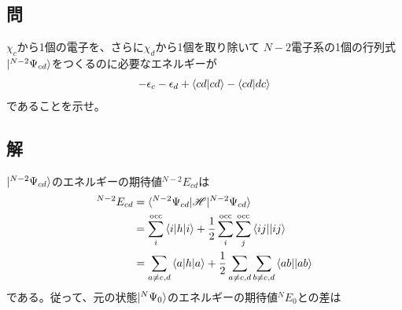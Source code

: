 \subsection{問}
$\chi_c$から1個の電子を、さらに$\chi_d$から1個を取り除いて
$N-2$電子系の1個の行列式$\ket{^{N-2}\Psi_{cd}}$をつくるのに必要なエネルギーが
\begin{align}
	-
	\epsilon_c
	-
	\epsilon_d
	+
	{\braket{cd|cd}}
	-
	{\braket{cd|dc}}
\end{align}
であることを示せ。


\subsection{解}
$\ket{^{N-2}\Psi_{cd}}$のエネルギーの期待値$^{N-2}E_{cd}$は
\begin{align}
	^{N-2}E_{cd}
&=
	\braket{^{N-2}\Psi_{cd}|\H|^{N-2}\Psi_{cd}} \\
%
%
&=
	\sum_{i}^{\rm occ}
		\braket{i|h|i}
	+
	\frac{1}{2}
	\sum_{i}^{\rm occ}
	\sum_{j}^{\rm occ}
		\antitwo{ij}{ij} \\
%
%
&=
	\sum_{a\neq c,d}
		\braket{a|h|a}
	+
	\frac{1}{2}
	\sum_{a\neq c,d}
	\sum_{b\neq c,d}
		\antitwo{ab}{ab}
\end{align}
である。従って、元の状態$\ket{^N\Psi_0}$のエネルギーの期待値$^{N}E_0$との差は
